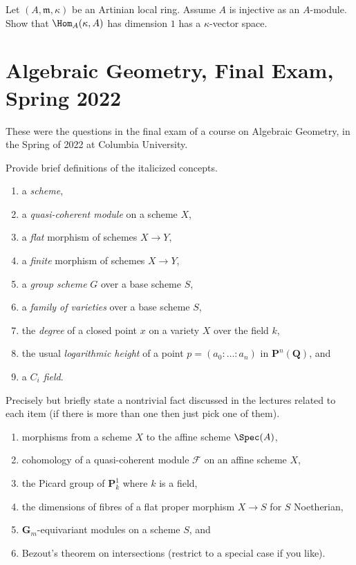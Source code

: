 \begin{exercise}[Injectives]
\label{exercise-injective-artinian-local}
Let $(A, \mathfrak m, \kappa)$ be an Artinian local ring.
Assume $A$ is injective as an $A$-module. Show that
$\Hom_A(\kappa, A)$ has dimension $1$ has a
$\kappa$-vector space.
\end{exercise}



\section{Algebraic Geometry, Final Exam, Spring 2022}
\label{section-final-exam-spring-2022}

\noindent
These were the questions in the final exam of a course on Algebraic Geometry,
in the Spring of 2022 at Columbia University.

\begin{exercise}[Definitions]
\label{exercise-definitions-spring-2022}
Provide brief definitions of the italicized concepts.
\begin{enumerate}
\item a {\it scheme},
\item a {\it quasi-coherent module} on a scheme $X$,
\item a {\it flat} morphism of schemes $X \to Y$,
\item a {\it finite} morphism of schemes $X \to Y$,
\item a {\it group scheme} $G$ over a base scheme $S$,
\item a {\it family of varieties} over a base scheme $S$,
\item the {\it degree} of a closed point $x$ on a variety $X$
over the field $k$,
\item the usual {\it logarithmic height} of a point
$p = (a_0 : \ldots : a_n)$ in $\mathbf{P}^n(\mathbf{Q})$, and
\item a {\it $C_i$ field}.
\end{enumerate}
\end{exercise}

\begin{exercise}[Theorems]
\label{exercise-results-spring-2022}
Precisely but briefly state a nontrivial fact discussed in the lectures
related to each item (if there is more than one then just pick
one of them).
\begin{enumerate}
\item morphisms from a scheme $X$ to the affine scheme $\Spec(A)$,
\item cohomology of a quasi-coherent module $\mathcal{F}$ on
an affine scheme $X$,
\item the Picard group of $\mathbf{P}^1_k$ where $k$ is a field,
\item the dimensions of fibres of a flat proper morphism
$X \to S$ for $S$ Noetherian,
\item $\mathbf{G}_m$-equivariant modules on a scheme $S$, and
\item Bezout's theorem on intersections (restrict to
a special case if you like).
\end{enumerate}
\end{exercise}

